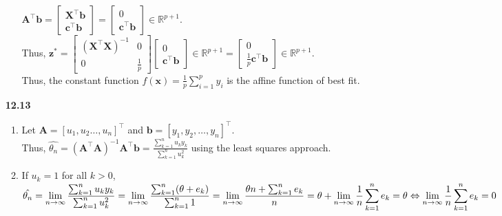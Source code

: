 \documentclass[10pt]{article}
\begin{document}
\begin{enumerate}
\begin{enumerate}
        $\mathbf{A}^\top\mathbf{b}=\begin{bmatrix}
            \mathbf{X}^\top\mathbf{b}\\
            \mathbf{c}^\top\mathbf{b}
        \end{bmatrix}=\begin{bmatrix}
            0\\
            \mathbf{c}^\top\mathbf{b}
        \end{bmatrix}\in\mathbb{R}^{p+1}$.\\
        Thus, $\mathbf{z}^*=\begin{bmatrix}
            {(\mathbf{X}^\top\mathbf{X})}^{-1} & 0\\
            0 & \frac{1}{p}
        \end{bmatrix}\begin{bmatrix}
            0\\
            \mathbf{c}^\top\mathbf{b}
        \end{bmatrix}\in\mathbb{R}^{p+1}=\begin{bmatrix}
            0\\
            \frac{1}{p}\mathbf{c}^\top\mathbf{b}
        \end{bmatrix}\in\mathbb{R}^{p+1}$.\\
        Thus, the constant function $\displaystyle f(\mathbf{x})=\frac{1}{p}\sum_{i=1}^{p}y_i$ is the affine function of best fit.
    \end{enumerate}
    \item [\textbf{12.13}] \begin{enumerate}
        \item Let $\mathbf{A}={[u_1,u_2\ldots,u_n]}^\top$ and $\mathbf{b}={[y_1,y_2,\ldots,y_n]}^\top$.\\
        Thus, $\hat{\theta_n}={(\mathbf{A}^\top\mathbf{A})}^{-1}\mathbf{A}^\top\mathbf{b}=\frac{\sum_{k=1}^{n}u_k y_k}{\sum_{k=1}^{n}u_k^2}$ using the least squares approach.
        \item If $u_k=1$ for all $k>0$,
        $\hat{\theta_n}=\displaystyle\lim_{n\rightarrow\infty}\frac{\sum_{k=1}^{n}u_k y_k}{\sum_{k=1}^{n}u_k^2}
        =\lim_{n\rightarrow\infty}\frac{\sum_{k=1}^{n}(\theta+e_k)}{\sum_{k=1}^{n}1}\\
        =\lim_{n\rightarrow\infty}\frac{\theta n+\sum_{k=1}^{n}e_k}{n}\\
        =\theta+\lim_{n\rightarrow\infty}\frac{1}{n}\sum_{k=1}^{n}e_k=\theta\Leftrightarrow\lim_{n\rightarrow\infty}\frac{1}{n}\sum_{k=1}^{n}e_k=0$
    \end{enumerate}

\end{enumerate}
\end{document}
